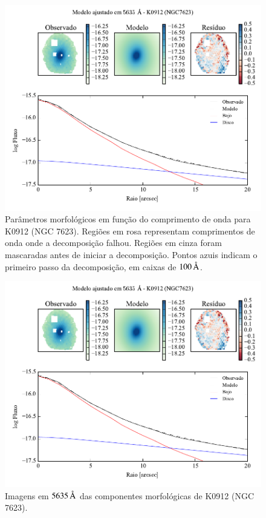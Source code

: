 \begin{figure}
	\includegraphics[page=2]{figuras-decomp/K0912_sample006a}
	\caption[Parâmetros morfológicos em função do comprimento de onda de K0912
	(NGC 7623)]
	{Parâmetros morfológicos em função do comprimento de onda para
	K0912 (NGC 7623). Regiões em rosa representam comprimentos de onda onde a
	decomposição falhou. Regiões em cinza foram mascaradas antes de iniciar a
	decomposição. Pontos azuis indicam o primeiro passo da decomposição, em caixas
	de $100\,\text{\normalfont\AA}$.}
	\label{fig:decompParams:K0912}
\end{figure}

\begin{figure}
	\includegraphics[page=3]{figuras-decomp/K0912_sample006a}
	\caption[Imagens em $5635\,\angstrom$ das componentes morfológicas de K0912
	(NGC 7623)]
	{Imagens em $5635\,\angstrom$ das componentes morfológicas de K0912
	(NGC 7623).}
	\label{fig:decompImages:K0912}
\end{figure}

